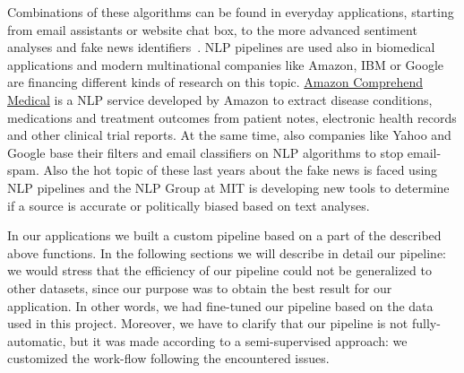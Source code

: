 \documentclass{standalone}
\begin{document}
Combinations of these algorithms can be found in everyday applications, starting from email assistants or website chat box, to the more advanced sentiment analyses and fake news identifiers~\cite{IJST119594, MitaliSentiment2016, sharma2019combating, zhou2018fake}.
NLP pipelines are used also in biomedical applications and modern multinational companies like Amazon, IBM or Google are financing different kinds of research on this topic.
\href{https://aws.amazon.com/it/comprehend/medical/}{Amazon Comprehend Medical} is a NLP service developed by Amazon to extract disease conditions, medications and treatment outcomes from patient notes, electronic health records and other clinical trial reports.
At the same time, also companies like Yahoo and Google base their filters and email classifiers on NLP algorithms to stop email-spam.
Also the hot topic of these last years about the fake news is faced using NLP pipelines and the NLP Group at MIT is developing new tools to determine if a source is accurate or politically biased based on text analyses.

In our applications we built a custom pipeline based on a part of the described above functions.
In the following sections we will describe in detail our pipeline: we would stress that the efficiency of our pipeline could not be generalized to other datasets, since our purpose was to obtain the best result for our application.
In other words, we had fine-tuned our pipeline based on the data used in this project.
Moreover, we have to clarify that our pipeline is not fully-automatic, but it was made according to a semi-supervised approach: we customized the work-flow following the encountered issues.
\end{document}
